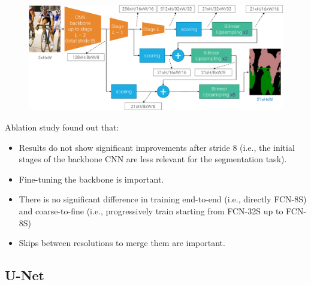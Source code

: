 \begin{description}
\begin{description}
\begin{descriptionlist}
                        \begin{figure}[H]
                            \raggedleft
                            \includegraphics[width=0.85\linewidth]{./img/_fcn_8.pdf}
                        \end{figure}
                \end{descriptionlist}

                \begin{remark}
                    Ablation study found out that:
                    \begin{itemize}
                        \item Results do not show significant improvements after stride $8$ (i.e., the initial stages of the backbone CNN are less relevant for the segmentation task).
                        \item Fine-tuning the backbone is important.
                        \item There is no significant difference in training end-to-end (i.e., directly FCN-8S) and coarse-to-fine (i.e., progressively train starting from FCN-32S up to FCN-8S)
                        \item Skips between resolutions to merge them are important.
                    \end{itemize}
                \end{remark}
        \end{description}
\end{description}


\subsection{U-Net}

